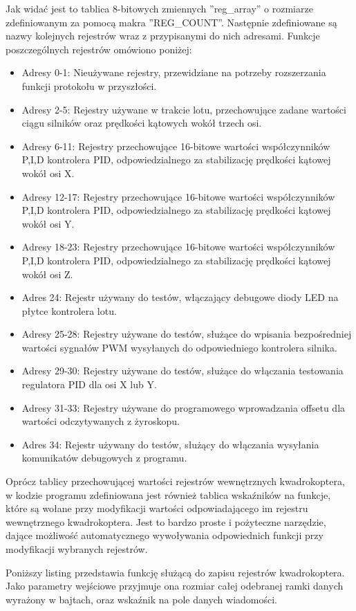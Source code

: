Jak widać jest to tablica 8-bitowych zmiennych ''reg\_array'' o rozmiarze zdefiniowanym za pomocą makra ''REG\_COUNT''. Następnie zdefiniowane są nazwy kolejnych rejestrów wraz z przypisanymi do nich adresami. Funkcje poszczególnych rejestrów omówiono poniżej:
\begin{itemize}
	\item Adresy 0-1: Nieużywane rejestry, przewidziane na potrzeby rozszerzania funkcji protokołu w przyszłości.
	\item Adresy 2-5: Rejestry używane w trakcie lotu, przechowujące zadane wartości ciągu silników oraz prędkości kątowych wokół trzech osi.
	\item Adresy 6-11: Rejestry przechowujące 16-bitowe wartości współczynników P,I,D kontrolera PID, odpowiedzialnego za stabilizację prędkości kątowej wokół osi X.
	\item Adresy 12-17: Rejestry przechowujące 16-bitowe wartości współczynników P,I,D kontrolera PID, odpowiedzialnego za stabilizację prędkości kątowej wokół osi Y.
	\item Adresy 18-23: Rejestry przechowujące 16-bitowe wartości współczynników P,I,D kontrolera PID, odpowiedzialnego za stabilizację prędkości kątowej wokół osi Z.
	\item Adres 24: Rejestr używany do testów, włączający debugowe diody LED na płytce kontrolera lotu.
	\item Adresy 25-28: Rejestry używane do testów, służące do wpisania bezpośredniej wartości sygnałów PWM wysyłanych do odpowiedniego kontrolera silnika.
	\item Adresy 29-30: Rejestry używane do testów, służące do włączania testowania regulatora PID dla osi X lub Y.
	\item Adresy 31-33: Rejestry używane do programowego wprowadzania offsetu dla wartości odczytywanych z żyroskopu.
	\item Adres 34: Rejestr używany do testów, służący do włączania wysyłania komunikatów debugowych z programu.
\end{itemize}

Oprócz tablicy przechowującej wartości rejestrów wewnętrznych kwadrokoptera, w kodzie programu zdefiniowana jest również tablica wskaźników na funkcje, które są wołane przy modyfikacji wartości odpowiadającego im rejestru wewnętrznego kwadrokoptera. Jest to bardzo proste i pożyteczne narzędzie, dające możliwość automatycznego wywoływania odpowiednich funkcji przy modyfikacji wybranych rejestrów.


Poniższy listing przedstawia funkcję służącą do zapisu rejestrów kwadrokoptera. Jako parametry wejściowe przyjmuje ona rozmiar całej odebranej ramki danych wyrażony w bajtach, oraz wskaźnik na pole danych wiadomości.

